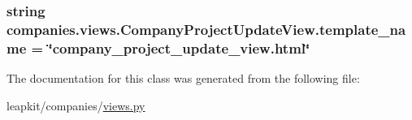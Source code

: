 \hypertarget{classcompanies_1_1views_1_1_company_project_update_view_afce304bbe0537dece8c1bf2e546f9c18}{
\subsubsection[{template\-\_\-name}]{\setlength{\rightskip}{0pt plus 5cm}string companies.\-views.\-Company\-Project\-Update\-View.\-template\-\_\-name = \char`\"{}company\-\_\-project\-\_\-update\-\_\-view.\-html\char`\"{}\hspace{0.3cm}{\ttfamily [static]}}}\label{classcompanies_1_1views_1_1_company_project_update_view_afce304bbe0537dece8c1bf2e546f9c18}


The documentation for this class was generated from the following file\-:\begin{DoxyCompactItemize}
\item 
leapkit/companies/\hyperlink{companies_2views_8py}{views.\-py}\end{DoxyCompactItemize}
